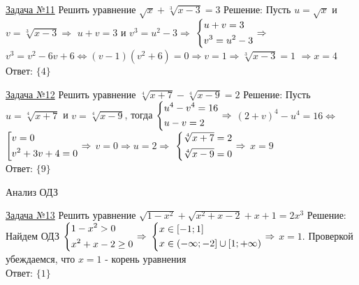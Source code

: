 \documentclass[a4paper,12pt]{article} %
\begin{document}
\label{Problem11}
\underline{Задача №11} 
Решить уравнение $\sqrt{x}+\sqrt[3]{x-3}=3$\newline
Решение: Пусть $u=\sqrt{x}$ и $v=\sqrt[3]{x-3} \Rightarrow$
$u+v=3$ и $v^3=u^2-3 \Rightarrow$
$\begin{dcases}
	u+v=3 \\
	v^3=u^2-3
\end{dcases} \Rightarrow$
$v^3=v^2-6v+6 \Leftrightarrow (v-1)(v^2+6)=0 \Rightarrow v=1 \Rightarrow \sqrt[3]{x-3}=1 $
$\Rightarrow x=4$\\
Ответ: $\{ 4 \}$

\label{Problem12}
\underline{Задача №12} 
Решить уравнение $\sqrt[4]{x+7}-\sqrt[4]{x-9}=2$\newline
Решение: Пусть $u=\sqrt[4]{x+7}$ и $v=\sqrt[4]{x-9}$, тогда
$\begin{dcases}
	u^4-v^4=16 \\
	u-v=2
\end{dcases} \Rightarrow$
$(2+v)^4-u^4=16 \Leftrightarrow $
$\left[\begin{gathered}
	v=0 \hfill \\
	v^2+3v+4=0
\end{gathered}\right. \Rightarrow$
$v=0 \Rightarrow u=2 \Rightarrow $
$\begin{dcases}
	\sqrt[4]{x+7}=2 \\
	\sqrt[4]{x-9}=0
\end{dcases} \Rightarrow$
$x=9$\\
Ответ: $\{ 9 \}$

\begin{center}
{\large Анализ ОДЗ}
\end{center}

\label{Problem13}
\underline{Задача №13} 
Решить уравнение $\sqrt{1-x^2}+\sqrt{x^2+x-2}+x+1=2x^3$\newline
Решение: Найдем ОДЗ 
$\begin{dcases}
	1-x^2>0 \\
	x^2+x-2 \ge 0
\end{dcases} \Rightarrow$
$\begin{dcases}
	x \in [-1;1] \\
	x \in (-\infty;-2] \cup [1;+\infty)
\end{dcases} \Rightarrow$
$x=1.$ Проверкой убеждаемся, что $x=1$ - корень уравнения\\
Ответ: $\{ 1 \}$
\end{document}
